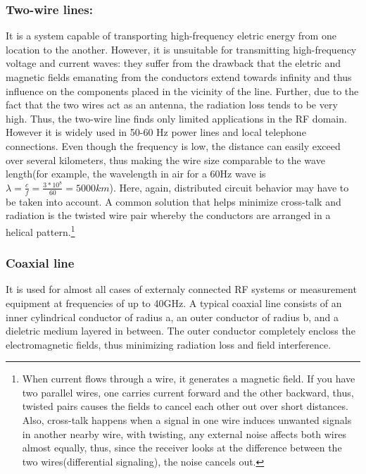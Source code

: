 \documentclass{article}
\begin{document}
\subsubsection{Two-wire lines:}
It is a system capable of transporting high-frequency eletric energy from one location to the another. However, it is unsuitable for transmitting high-frequency voltage and current waves: they suffer from the drawback that the eletric and magnetic fields emanating from the conductors extend towards infinity and thus influence on the components placed in the vicinity of the line.
\vspace{5cm}
Further, due to the fact that the two wires act as an antenna, the radiation loss tends to be very high. Thus, the two-wire line finds only limited applications in the RF domain. However it is widely used in 50-60 Hz power lines and local telephone connections. Even though the frequency is low, the distance can easily exceed over several kilometers, thus making the wire size comparable to the wave length(for example, the wavelength in air for a 60Hz wave is \(\lambda=\frac{c}{f}= \frac{3*10^8}{60}=5000km\)). Here, again, distributed circuit behavior may have to be taken into account. A common solution that helps minimize cross-talk and radiation is the twisted wire pair whereby the conductors are arranged in a helical pattern.\footnote{When current flows through a wire, it generates a magnetic field. If you have two parallel wires, one carries current forward and the other backward, thus, twisted pairs causes the fields to cancel each other out over short distances. Also, cross-talk happens when a signal in one wire induces unwanted signals in another nearby wire, with twisting, any external noise affects both wires almost equally, thus, since the receiver looks at the difference between the two wires(differential signaling), the noise cancels out.}

\subsubsection{Coaxial line}
It is used for almost all cases of externaly connected RF systems or measurement equipment at frequencies of up to 40GHz. A typical coaxial line consists of an inner cylindrical conductor of radius a, an outer conductor of radius b, and a dieletric medium layered in between. The outer conductor completely encloss the electromagnetic fields, thus minimizing radiation loss and field interference.

\vspace{5cm}
\end{document}
